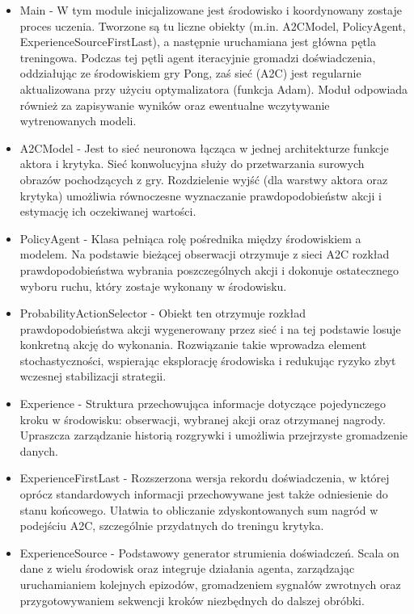 \documentclass[a4paper, 12pt]{article}
\numberwithin{equation}{section}
\begin{document}
    \begin{itemize}
        \item Main - W tym module inicjalizowane jest środowisko i koordynowany zostaje proces uczenia. Tworzone są tu liczne obiekty (m.in. A2CModel, PolicyAgent, ExperienceSourceFirstLast), a następnie uruchamiana jest główna pętla treningowa. Podczas tej pętli agent iteracyjnie gromadzi doświadczenia, oddziałując ze środowiskiem gry Pong, zaś sieć (A2C) jest regularnie aktualizowana przy użyciu optymalizatora (funkcja Adam). Moduł odpowiada również za zapisywanie wyników oraz ewentualne wczytywanie wytrenowanych modeli.
        \item A2CModel - Jest to sieć neuronowa łącząca w jednej architekturze funkcje aktora i krytyka. Sieć konwolucyjna służy do przetwarzania surowych obrazów pochodzących z gry. Rozdzielenie wyjść (dla warstwy aktora oraz krytyka) umożliwia równoczesne wyznaczanie prawdopodobieństw akcji i estymację ich oczekiwanej wartości.
        \item PolicyAgent - Klasa pełniąca rolę pośrednika między środowiskiem a modelem. Na podstawie bieżącej obserwacji otrzymuje z sieci A2C rozkład prawdopodobieństwa wybrania poszczególnych akcji i dokonuje ostatecznego wyboru ruchu, który zostaje wykonany w środowisku.
        \item ProbabilityActionSelector - Obiekt ten otrzymuje rozkład prawdopodobieństwa akcji wygenerowany przez sieć i na tej podstawie losuje konkretną akcję do wykonania. Rozwiązanie takie wprowadza element stochastyczności, wspierając eksplorację środowiska i redukując ryzyko zbyt wczesnej stabilizacji strategii.
        \item Experience - Struktura przechowująca informacje dotyczące pojedynczego kroku w środowisku: obserwacji, wybranej akcji oraz otrzymanej nagrody. Upraszcza zarządzanie historią rozgrywki i umożliwia przejrzyste gromadzenie danych.
        \item ExperienceFirstLast - Rozszerzona wersja rekordu doświadczenia, w której oprócz standardowych informacji przechowywane jest także odniesienie do stanu końcowego. Ułatwia to obliczanie zdyskontowanych sum nagród w podejściu A2C, szczególnie przydatnych do treningu krytyka.
        \item ExperienceSource - Podstawowy generator strumienia doświadczeń. Scala on dane z wielu środowisk oraz integruje działania agenta, zarządzając uruchamianiem kolejnych epizodów, gromadzeniem sygnałów zwrotnych oraz przygotowywaniem sekwencji kroków niezbędnych do dalszej obróbki.

\end{itemize}
\end{document}
